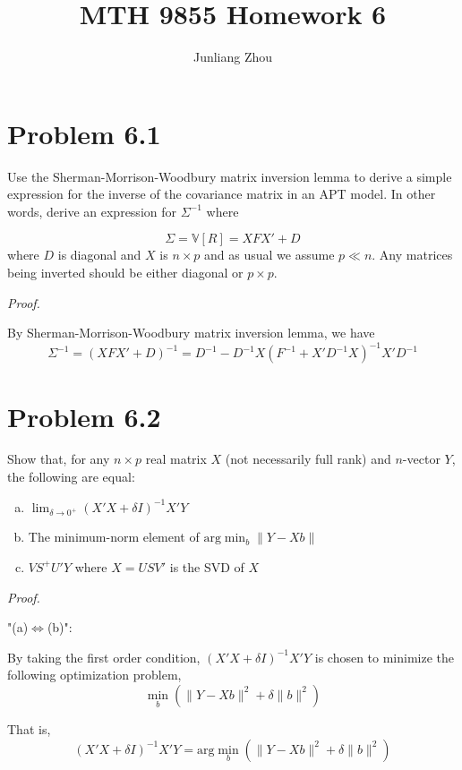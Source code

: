 \documentclass[a4paper]{article}
\title{MTH 9855 Homework 6}
\author{Junliang Zhou}
\begin{document}
\maketitle

\section{Problem 6.1}

Use the Sherman-Morrison-Woodbury matrix inversion lemma to derive a simple expression for the inverse of the covariance matrix in an APT model. In other words, derive an expression for $\Sigma^{-1}$ where

\[\Sigma=\mathbb{V}[R]=XFX'+D\]
where $D$ is diagonal and $X$ is $n\times p$ and as usual we assume $p\ll n$. Any matrices being inverted should be either diagonal or $p\times p$.\newline

\textit{Proof.}\newline

By Sherman-Morrison-Woodbury matrix inversion lemma, we have
\[\Sigma^{-1}={(XFX'+D)}^{-1}=D^{-1}-D^{-1} X {(F^{-1}+X' D^{-1} X)}^{-1} X' D^{-1}\]

\section{Problem 6.2}

Show that, for any $n\times p$ real matrix $X$ (not necessarily full rank) and $n$-vector $Y$, the following are equal:

\begin{enumerate}[(a)]
\item $\lim_{\delta \to 0^{+}} {(X'X+\delta I)}^{-1} X'Y$
\item The minimum-norm element of $\text{arg}\min_b \lVert Y-Xb \rVert$
\item $VS^{+}U'Y$ where $X=USV'$ is the SVD of $X$
\end{enumerate}

\textit{Proof.}\newline

"(a)$\Leftrightarrow$(b)":\newline

By taking the first order condition, $(X'X+\delta I)^{-1}X'Y$ is chosen to minimize the following optimization problem,
\[\min_b \left(\lVert Y-Xb \rVert^2 + \delta \lVert b \rVert^2 \right)\]

That is,
\[(X'X+\delta I)^{-1}X'Y=\text{arg}\min_b \left(\lVert Y-Xb \rVert^2 + \delta \lVert b \rVert^2 \right)\]
\end{document}
